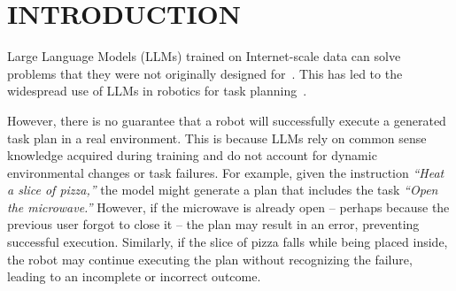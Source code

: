 \documentclass[letterpaper, 10 pt, conference]{ieeeconf}  %
\begin{document}
\section{INTRODUCTION}
\label{sec:intro}
Large Language Models (LLMs) trained on Internet-scale data can solve problems that they were not originally designed for~\cite{kojima2022large}. This has led to the widespread use of LLMs in robotics for task planning~\cite{huang2022language,kovalev2022application,sarkisyan2023evaluation,10160591,10801328,onishchenko2025lookplangraph}.

However, there is no guarantee that a robot will successfully execute a generated task plan in a real environment. This is because LLMs rely on common sense knowledge acquired during training and do not account for dynamic environmental changes or task failures. For example, given the instruction \textit{``Heat a slice of pizza,''} the model might generate a plan that includes the task \textit{``Open the microwave.''} However, if the microwave is already open -- perhaps because the previous user forgot to close it -- the plan may result in an error, preventing successful execution. Similarly, if the slice of pizza falls while being placed inside, the robot may continue executing the plan without recognizing the failure, leading to an incomplete or incorrect outcome.
\end{document}
